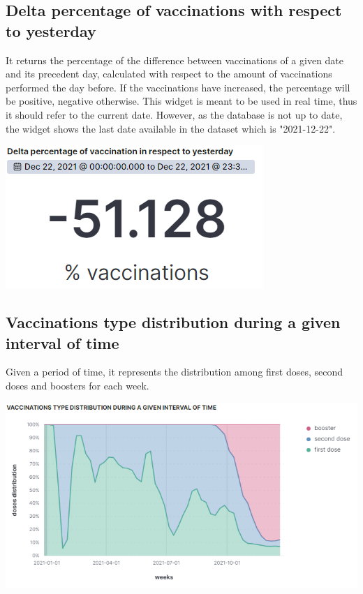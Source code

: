 \documentclass{article}
\begin{document}
\subsection{Delta percentage of vaccinations with respect to yesterday}
It returns the percentage of the difference between vaccinations of a given date and its precedent day, calculated with respect to the amount of vaccinations performed the day before.
If the vaccinations have increased, the percentage will be positive, negative otherwise.
This widget is meant to be used in real time, thus it should refer to the current date. However, as the database is not up to date, the widget shows the last date available in the dataset which is "2021-12-22".

\begin{center}
\includegraphics[scale=0.6]{delta_perc.png}
\end{center}

\subsection{Vaccinations type distribution during a given interval of time}
Given a period of time, it represents the distribution among first doses, second doses and boosters for each week.

\begin{center}
\includegraphics[scale=0.6]{vacc_distr.png}
\end{center}
\end{document}
